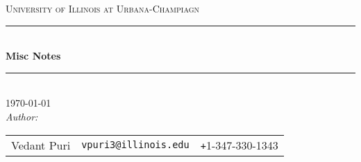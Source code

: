 %
\newcommand{\HRule}{\rule{\linewidth}{0.5mm}}
\center
\textsc{\LARGE University of Illinois at Urbana-Champiagn}\\[1cm]
\HRule \\[0.4cm]

{ 
  \huge \bfseries Misc Notes \\[0.5cm]
}

\HRule \\[1cm]
{\Large \today}\\[1cm]
\emph{Author:}\\
\begin{tabular}{l r l}
  Vedant Puri         & \texttt{vpuri3@illinois.edu}  &  \texttt{+}1-347-330-1343 \\
\end{tabular}\\[0.5cm]

\vfill